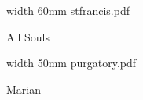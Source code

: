 

\eject



\bigskip

\pdfximage width 60mm {stfrancis.pdf}

\centerline{\pdfrefximage \pdflastximage}



\eject

\beginpart All Souls



\paginaproxima


\bigskip

\pdfximage width 50mm {purgatory.pdf}

\centerline{\pdfrefximage \pdflastximage}



\eject

\beginpart Marian


\bigskip



\paginaproxima

%


%




\bigskip




\eject


\paginaproxima



\paginaproxima


\paginaproxima


\paginaproxima




